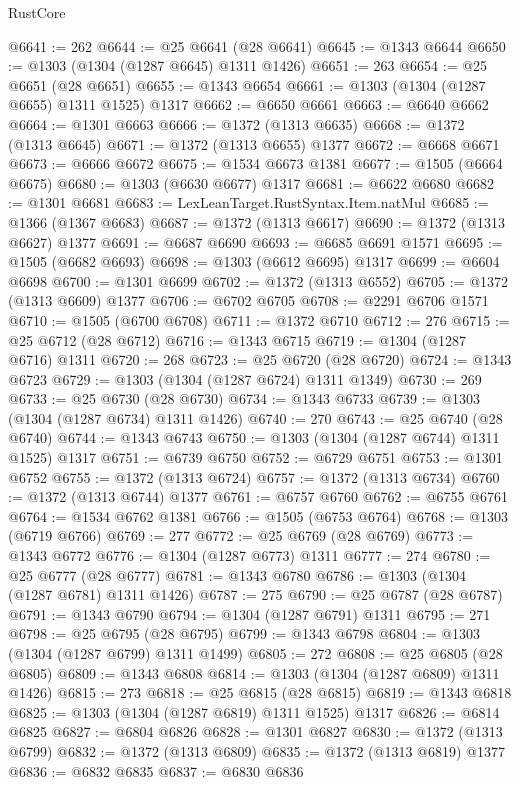 \begin{lexlean}{RustCore}
\begin{coremodule}
@6641 := 262
@6644 := @25 @6641 (@28 @6641)
@6645 := @1343 @6644
@6650 := @1303 (@1304 (@1287 @6645) @1311 @1426)
@6651 := 263
@6654 := @25 @6651 (@28 @6651)
@6655 := @1343 @6654
@6661 := @1303 (@1304 (@1287 @6655) @1311 @1525) @1317
@6662 := @6650 @6661
@6663 := @6640 @6662
@6664 := @1301 @6663
@6666 := @1372 (@1313 @6635)
@6668 := @1372 (@1313 @6645)
@6671 := @1372 (@1313 @6655) @1377
@6672 := @6668 @6671
@6673 := @6666 @6672
@6675 := @1534 @6673 @1381
@6677 := @1505 (@6664 @6675)
@6680 := @1303 (@6630 @6677) @1317
@6681 := @6622 @6680
@6682 := @1301 @6681
@6683 := LexLeanTarget.RustSyntax.Item.natMul
@6685 := @1366 (@1367 @6683)
@6687 := @1372 (@1313 @6617)
@6690 := @1372 (@1313 @6627) @1377
@6691 := @6687 @6690
@6693 := @6685 @6691 @1571
@6695 := @1505 (@6682 @6693)
@6698 := @1303 (@6612 @6695) @1317
@6699 := @6604 @6698
@6700 := @1301 @6699
@6702 := @1372 (@1313 @6552)
@6705 := @1372 (@1313 @6609) @1377
@6706 := @6702 @6705
@6708 := @2291 @6706 @1571
@6710 := @1505 (@6700 @6708)
@6711 := @1372 @6710
@6712 := 276
@6715 := @25 @6712 (@28 @6712)
@6716 := @1343 @6715
@6719 := @1304 (@1287 @6716) @1311
@6720 := 268
@6723 := @25 @6720 (@28 @6720)
@6724 := @1343 @6723
@6729 := @1303 (@1304 (@1287 @6724) @1311 @1349)
@6730 := 269
@6733 := @25 @6730 (@28 @6730)
@6734 := @1343 @6733
@6739 := @1303 (@1304 (@1287 @6734) @1311 @1426)
@6740 := 270
@6743 := @25 @6740 (@28 @6740)
@6744 := @1343 @6743
@6750 := @1303 (@1304 (@1287 @6744) @1311 @1525) @1317
@6751 := @6739 @6750
@6752 := @6729 @6751
@6753 := @1301 @6752
@6755 := @1372 (@1313 @6724)
@6757 := @1372 (@1313 @6734)
@6760 := @1372 (@1313 @6744) @1377
@6761 := @6757 @6760
@6762 := @6755 @6761
@6764 := @1534 @6762 @1381
@6766 := @1505 (@6753 @6764)
@6768 := @1303 (@6719 @6766)
@6769 := 277
@6772 := @25 @6769 (@28 @6769)
@6773 := @1343 @6772
@6776 := @1304 (@1287 @6773) @1311
@6777 := 274
@6780 := @25 @6777 (@28 @6777)
@6781 := @1343 @6780
@6786 := @1303 (@1304 (@1287 @6781) @1311 @1426)
@6787 := 275
@6790 := @25 @6787 (@28 @6787)
@6791 := @1343 @6790
@6794 := @1304 (@1287 @6791) @1311
@6795 := 271
@6798 := @25 @6795 (@28 @6795)
@6799 := @1343 @6798
@6804 := @1303 (@1304 (@1287 @6799) @1311 @1499)
@6805 := 272
@6808 := @25 @6805 (@28 @6805)
@6809 := @1343 @6808
@6814 := @1303 (@1304 (@1287 @6809) @1311 @1426)
@6815 := 273
@6818 := @25 @6815 (@28 @6815)
@6819 := @1343 @6818
@6825 := @1303 (@1304 (@1287 @6819) @1311 @1525) @1317
@6826 := @6814 @6825
@6827 := @6804 @6826
@6828 := @1301 @6827
@6830 := @1372 (@1313 @6799)
@6832 := @1372 (@1313 @6809)
@6835 := @1372 (@1313 @6819) @1377
@6836 := @6832 @6835
@6837 := @6830 @6836

\end{coremodule}
\end{lexlean}
